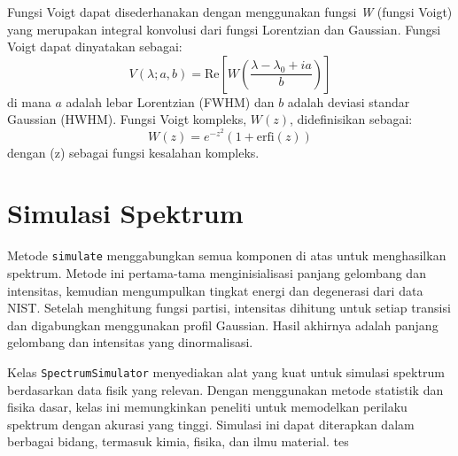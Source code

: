 \par Fungsi Voigt dapat disederhanakan dengan menggunakan fungsi \textit{W} (fungsi Voigt) yang merupakan integral konvolusi dari fungsi Lorentzian dan Gaussian. Fungsi Voigt dapat dinyatakan sebagai: %
\begin{equation}
V(\lambda; a, b) = \text{Re} \left[ W\left(\frac{\lambda - \lambda_0 + i a}{b}\right) \right]
\end{equation}
di mana \( a \) adalah lebar Lorentzian (FWHM) dan \( b \) adalah deviasi standar Gaussian (HWHM). Fungsi Voigt kompleks, \( W(z) \), didefinisikan sebagai:
\begin{equation}
W(z) = e^{-z^2} \left( 1 + \text{erfi}(z) \right)
\end{equation}
dengan (z) sebagai fungsi kesalahan kompleks.

\section{Simulasi Spektrum}
\par Metode \texttt{simulate} menggabungkan semua komponen di atas untuk menghasilkan spektrum. Metode ini pertama-tama menginisialisasi panjang gelombang dan intensitas, kemudian mengumpulkan tingkat energi dan degenerasi dari data NIST. Setelah menghitung fungsi partisi, intensitas dihitung untuk setiap transisi dan digabungkan menggunakan profil Gaussian. Hasil akhirnya adalah panjang gelombang dan intensitas yang dinormalisasi.

\par Kelas \texttt{SpectrumSimulator} menyediakan alat yang kuat untuk simulasi spektrum berdasarkan data fisik yang relevan. Dengan menggunakan metode statistik dan fisika dasar, kelas ini memungkinkan peneliti untuk memodelkan perilaku spektrum dengan akurasi yang tinggi. Simulasi ini dapat diterapkan dalam berbagai bidang, termasuk kimia, fisika, dan ilmu material. tes

